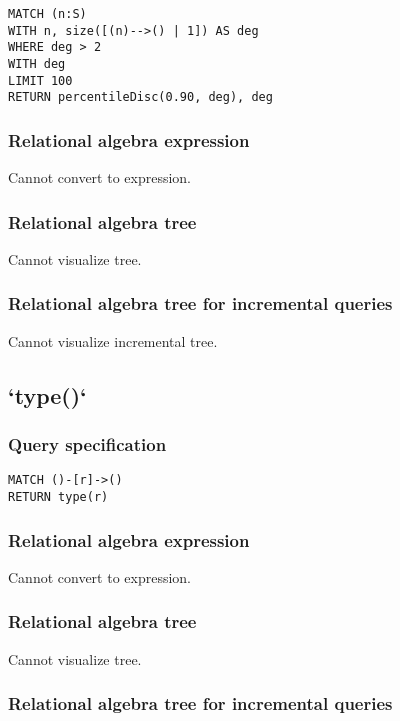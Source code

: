 \begin{lstlisting}
MATCH (n:S)
WITH n, size([(n)-->() | 1]) AS deg
WHERE deg > 2
WITH deg
LIMIT 100
RETURN percentileDisc(0.90, deg), deg
\end{lstlisting}

\subsubsection*{Relational algebra expression}

Cannot convert to expression.

\subsubsection*{Relational algebra tree}

Cannot visualize tree.

\subsubsection*{Relational algebra tree for incremental queries}

Cannot visualize incremental tree.

\subsection{`type()`}

\subsubsection*{Query specification}

\begin{lstlisting}
MATCH ()-[r]->()
RETURN type(r)
\end{lstlisting}

\subsubsection*{Relational algebra expression}

Cannot convert to expression.

\subsubsection*{Relational algebra tree}

Cannot visualize tree.

\subsubsection*{Relational algebra tree for incremental queries}

